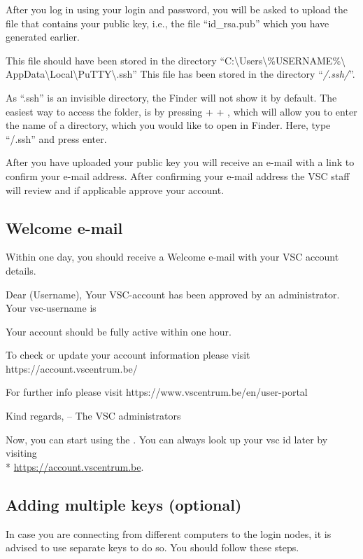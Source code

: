 After you log in using your \university login and password,
you will be asked to upload the file that contains
your public key, i.e., the file ``id\_rsa.pub'' which you have
generated earlier.

\ifwindows
  This file should have been stored in the directory
  ``C:\textbackslash Users\textbackslash \%USERNAME\%\textbackslash
  AppData\textbackslash Local\textbackslash PuTTY\textbackslash .ssh''
\fi
\ifmacORlinux
  This file has been stored in the directory ``\emph{\tilde/.ssh/}''.
\fi

\ifmac
\begin{tip}
  As ``.ssh'' is an invisible directory, the Finder will
  not show it by default. The easiest way to access the folder, is by pressing
   +  + , which will allow you to enter the name of a directory, which
  you would like to open in Finder. Here, type ``\tilde/.ssh'' and press enter.
\end{tip}
\fi

After you have uploaded your public key you will receive an e-mail with a link to
confirm your e-mail address. After confirming your e-mail address the VSC staff will
review and if applicable approve your account.

\subsection{Welcome e-mail}
\label{sec:welcome-email}

Within one day, you should receive a Welcome e-mail with your VSC account details.

\begin{flattext}
Dear (Username),
Your VSC-account has been approved by an administrator.
Your vsc-username is %

Your account should be fully active within one hour.

To check or update your account information please visit
https://account.vscentrum.be/

For further info please visit https://www.vscentrum.be/en/user-portal

Kind regards,
-- The VSC administrators
\end{flattext}

Now, you can start using the \hpc. You can always look up your vsc id later by visiting\\*
\url{https://account.vscentrum.be}.

\subsection{Adding multiple keys (optional)}
\label{sec:adding-multiple-keys}
In case you are connecting from different computers to the login nodes, it is advised to use separate keys to do so.
You should follow these steps.

